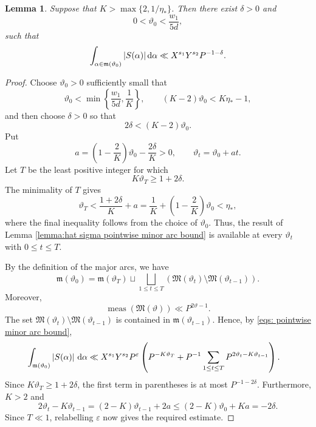\documentclass[12pt,reqno]{amsart}
\newtheorem{lemma}[theorem]{Lemma}
\theoremstyle{definition}
\theoremstyle{remark}
\numberwithin{equation}{section}
\def\grm{{\mathfrak m}}\def\grM{{\mathfrak M}}
\def\a{{\alpha}} \def\bfalp{{\boldsymbol \alpha}} \def\atil{{\widetilde \alpha}}
\def\eps{\varepsilon}
\def\d{{\,{\rm d}}}
\begin{document}
\begin{lemma}\label{lemma: minor arc bound}
    Suppose that $K > \max\{ 2, 1/\eta_*\}$. Then there exist $\delta>0$ and
    \[
        0<\vartheta_0<\frac{w_1}{5d},
    \]
    such that
    \[\int_{\a \in \grm(\vartheta_0)} |S(\a)| \d \a \ll X^{s_1}Y^{s_2}P^{-1-\delta}.\]
\end{lemma}
\begin{proof}
    Choose $\vartheta_0>0$ sufficiently small that
    \[
        \vartheta_0<\min\left\{\frac{w_1}{5d},\frac1K\right\},
        \qquad
        (K-2)\vartheta_0<K\eta_*-1,
    \]
    and then choose $\delta>0$ so that
    \[
        2\delta<(K-2)\vartheta_0.
    \]
    Put
    \[
        a=\left(1-\frac{2}{K}\right)\vartheta_0
        -\frac{2\delta}{K}>0,
        \qquad
        \vartheta_t=\vartheta_0+at.
    \]
    Let $T$ be the least positive integer for which
    \[
        K\vartheta_T\geq1+2\delta.
    \]
    The minimality of $T$ gives
    \[
        \vartheta_T<\frac{1+2\delta}{K}+a
        =\frac1K+\left(1-\frac2K\right)\vartheta_0
        <\eta_*,
    \]
    where the final inequality follows from the choice of $\vartheta_0$.
    Thus, the result of Lemma
    \ref{lemma:hat sigma pointwise minor arc bound} is available at every
    $\vartheta_t$ with $0\leq t\leq T$.

    By the definition of the major arcs, we have
    \[
        \grm(\vartheta_0)
        =\grm(\vartheta_T)\sqcup
        \bigsqcup_{1\leq t\leq T}
        \left(\grM(\vartheta_t)\setminus
        \grM(\vartheta_{t-1})\right).
    \]
    Moreover,
    \[
        \operatorname{meas}(\grM(\vartheta))
        \ll P^{2\vartheta-1}.
    \]
    The set
    $\grM(\vartheta_t)\setminus\grM(\vartheta_{t-1})$ is contained in
    $\grm(\vartheta_{t-1})$. Hence, by
    \eqref{eqs: pointwise minor arc bound},
    \begin{align*}
        \int_{\grm(\vartheta_0)}|S(\a)|\,\d\a
        &\ll X^{s_1}Y^{s_2}P^\eps
        \left(
            P^{-K\vartheta_T}
            +P^{-1}\sum_{1\leq t\leq T}
            P^{2\vartheta_t-K\vartheta_{t-1}}
        \right).
    \end{align*}
    Since $K\vartheta_T\geq1+2\delta$, the first term in parentheses is
    at most $P^{-1-2\delta}$. Furthermore, $K>2$ and
    \[
        2\vartheta_t-K\vartheta_{t-1}
        =(2-K)\vartheta_{t-1}+2a
        \leq(2-K)\vartheta_0+Ka
        =-2\delta.
    \]
    Since $T\ll1$, relabelling $\eps$ now gives the required estimate.
\end{proof}
\end{document}
